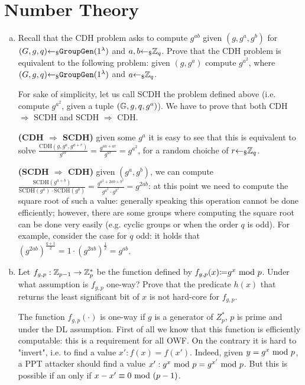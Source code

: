 \section{Number Theory}
\begin{enumerate}[(a)]
	\item Recall that the CDH problem asks to compute $g^{ab}$ given $(g, g^a, g^b)$ for $(G, g, q) {\leftarrow_\$} \texttt{GroupGen}(1^\lambda)$ and $a, b {\leftarrow_\$} {\mathbb Z}_q$. Prove that the CDH problem is equivalent to the following problem: given $(g, g^a)$ compute $g^{a^2}$, where $(G, g, q) {\leftarrow_\$} \texttt{GroupGen}(1^\lambda)$ and $a {\leftarrow_\$} {\mathbb Z}_q$.

	      \begin{solution}
		      For sake of simplicity, let us call SCDH the problem defined above (i.e. compute $g^{a^2}$, given a tuple $({\mathbb G}, g, q, g^a)$). We have to prove that both CDH $\Rightarrow$ SCDH and SCDH $\Rightarrow$ CDH.

		      \bigskip
		      \textbf{(CDH $\Rightarrow$ SCDH)} given some $g^a$ it is easy to see that this is equivalent to solve $\frac{\mbox{CDH}(g, g^a, g^{a+r})}{g^{ar}} = \frac{g^{aa + ar}}{g^{ar}} = g^{a^2}$, for a random choiche of $r {\leftarrow_\$} {\mathbb Z}_q$.

		      \bigskip
		      \textbf{(SCDH $\Rightarrow$ CDH)} given $(g^a, g^b)$, we can compute $\frac{\mbox{SCDH}(g^{a+b})}{\mbox{SCDH}(g^a) \cdot \mbox{SCDH}(g^b)} = \frac{g^{a^2+2ab + b^2}}{g^{a^2} \cdot g^{b^2}} = g^{2ab}$: at this point we need to compute the square root of such a value: generally speaking this operation cannot be done efficiently; however, there are some groups where computing the square root can be done very easily (e.g. cyclic groups or when the order $q$ is odd). For example, consider the case for $q$ odd: it holds that $(g^{2ab})^{\frac{q + 1}{2}} = 1 \cdot (g^{2ab})^{\frac{1}{2}} = g^{ab}$.

	      \end{solution}

	\item Let $f_{g,p}: {\mathbb Z}_{p-1} \to {\mathbb Z}^*_p$ be the function defined by $f_{g,p}(x) {\coloneqq} g^x \mbox{ mod } p$. Under what assumption is $f_{g,p}$ one-way? Prove that the predicate $h(x)$ that returns the least significant bit of $x$ is not hard-core for $f_{g,p}$.

	      \begin{solution}
		      The function $f_{g,p}(\cdot)$ is one-way if $g$ is a generator of $Z_p^*$, $p$ is prime and under the DL assumption. First of all we know that this function is efficiently computable: this is a requirement for all OWF. On the contrary it is hard to "invert", i.e. to find a value $x': f(x) = f(x')$. Indeed, given $y = g^x \mbox{ mod } p$, a PPT attacker should find a value $x': g^x \mbox{ mod } p = g^{x'} \mbox{ mod } p$. But this is possible if an only if $x - x' \equiv 0 \mbox{ mod } (p-1)$.


\end{solution}
\end{enumerate}
